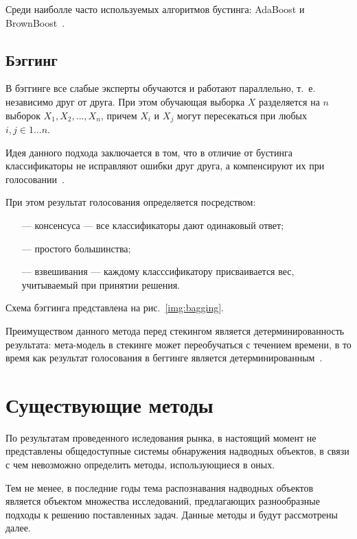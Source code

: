 Среди наиболле часто используемых алгоритмов бустинга: AdaBoost и BrownBoost~\cite{ensembles}.

\subsection{Бэггинг}

В бэггинге все слабые эксперты обучаются и работают параллельно, т.~е. независимо друг от друга. При этом обучающая выборка $X$ разделяется на $n$ выборок $X_1, X_2, \dots, X_n$, причем $X_i$ и $X_j$ могут пересекаться при любых $i,j \in 1 \dots n$.

Идея данного подхода заключается в том, что в отличие от бустинга классификаторы не исправляют ошибки друг друга, а компенсируют их при голосовании~\cite{ensembles}. 

При этом результат голосования определяется посредством:
\begin{itemize}
    \item[---] консенсуса --- все классификаторы дают одинаковый ответ;
    \item[---] простого большинства;
    \item[---] взвешивания --- каждому класссификатору присваивается вес, учитываемый при принятии решения.
\end{itemize}

Схема бэггинга представлена на рис.~\ref{img:bagging}.


Преимуществом данного метода перед стекингом является детерминированность результата: мета-модель в стекинге может переобучаться с течением времени, в то время как результат голосования в беггинге является детерминированным~\cite{ensembles}.

\section{Существующие методы}

По результатам проведенного иследования рынка, в настоящий момент не представлены общедоступные системы обнаружения надводных объектов, в связи с чем невозможно определить методы, использующиеся в оных. 

Тем не менее, в последние годы тема распознавания надводных объектов является объектом множества исследований, предлагающих разнообразные подходы к решению поставленных задач. Данные методы и будут рассмотрены далее.

